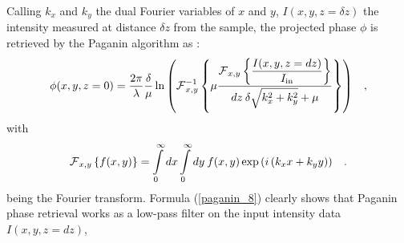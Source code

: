 {%
Calling $k_{x}$ and $k_{y}$ the dual Fourier variables of $x$ and $y$,
$I(x,y,z=\delta z)$ the intensity measured at distance $\delta z$ from the sample, the projected phase $\phi$ is retrieved by the Paganin algorithm
as \cite{Paganin2002}:
\begin{equation}
  \phi(x,y,z=0) = \frac{2\pi}{\lambda}\frac{\delta}{\mu} \ln\left( \operatorname{\mathcal{F}}_{x,y}^{-1}\left\{ \mu 
                  \frac{\displaystyle\operatorname{\mathcal{F}}_{x,y}\left\{\frac{I(x,y,z=dz)}{I_{\text{in}}}\right\}}{dz\:\delta\sqrt{k_{x}^{2}+k_{y}^{2}} + \mu} \right\} \right) \hspace{0.3cm},
  \label{paganin_8}
\end{equation}
with
\begin{equation}
  \operatorname{\mathcal{F}}_{x,y}\left\{f(x,y)\right\} = \int\limits_{0}^{\infty}dx\int\limits_{0}^{\infty}dy \: f(x,y)\exp\left(i\left(k_{x}x + k_{y}y\right)\right) \hspace{0.3cm}.
  \label{paganin_9}
\end{equation}
being the Fourier transform.
Formula (\ref{paganin_8}) clearly shows that Paganin phase retrieval works as a low-pass filter on the input intensity data $I(x,y,z=dz)$,
}
